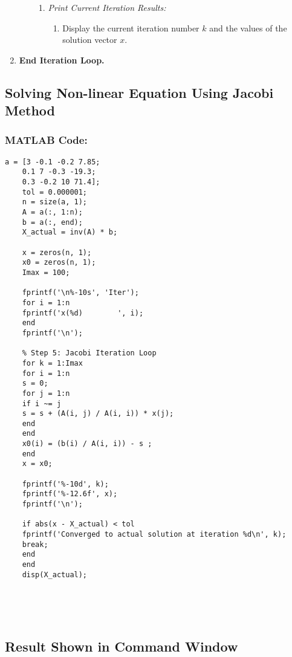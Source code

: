 \documentclass[a4paper,12pt]{article}
\begin{document}
\begin{enumerate}
\begin{enumerate}
\begin{enumerate}
			\item \textit{Print Current Iteration Results:}
			\begin{enumerate}
				\item Display the current iteration number $k$ and the values of the solution vector $x$.
			\end{enumerate}
		\end{enumerate}
	\end{enumerate}
	
	\item \textbf{End Iteration Loop.}
\end{enumerate}

	
	\newpage
	\subsection{Solving Non-linear Equation Using Jacobi Method}

	\subsubsection{MATLAB Code:}
	\begin{lstlisting}[style=vscode-light, caption={Solving Non-linear Equation Using Jacobi Method in MATLAB.} ]
	a = [3 -0.1 -0.2 7.85;
	0.1 7 -0.3 -19.3;
	0.3 -0.2 10 71.4];    
	tol = 0.000001;
	n = size(a, 1);              
	A = a(:, 1:n);              
	b = a(:, end);              
	X_actual = inv(A) * b;
	
	x = zeros(n, 1);             
	x0 = zeros(n, 1);            
	Imax = 100;                  
	
	fprintf('\n%-10s', 'Iter');
	for i = 1:n
	fprintf('x(%d)        ', i);
	end
	fprintf('\n');
	
	% Step 5: Jacobi Iteration Loop
	for k = 1:Imax
	for i = 1:n
	s = 0;
	for j = 1:n
	if i ~= j
	s = s + (A(i, j) / A(i, i)) * x(j);
	end
	end
	x0(i) = (b(i) / A(i, i)) - s ;
	end
	x = x0;
	
	fprintf('%-10d', k);
	fprintf('%-12.6f', x);
	fprintf('\n');
	
	if abs(x - X_actual) < tol
	fprintf('Converged to actual solution at iteration %d\n', k);
	break;
	end
	end
	disp(X_actual);
	
	
		
		
	\end{lstlisting}
	
	
	
	\newpage
	\subsection{Result Shown in Command Window}
	
\end{document}
